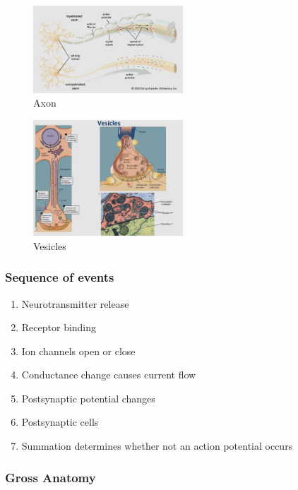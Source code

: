 \documentclass{article}
\begin{document}
    \begin{figure}[H]
    \centering
    \includegraphics[width=0.5\textwidth]{assets/axon.png}
    \caption{Axon}
    \end{figure}
    
    \begin{figure}[H]
    \centering
    \includegraphics[width=0.5\textwidth]{assets/vesicles.png}
    \caption{Vesicles}
    \end{figure}
    
    \subsubsection{Sequence of events}
    
    \begin{enumerate}
        \item Neurotransmitter release
        \item Receptor binding
        \item Ion channels open or close
        \item Conductance change causes current flow
        \item Postsynaptic potential changes
        \item Postsynaptic cells
        \item Summation determines whether not an action potential occurs
    \end{enumerate}
    
    \subsubsection{Gross Anatomy}
    
\end{document}
